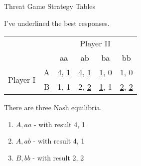 \documentclass[ignorenonframetext,]{beamer}
\providecommand{\tightlist}{%
  \setlength{\itemsep}{0pt}\setlength{\parskip}{0pt}}
\renewcommand{\,}{\text{, }}
\begin{document}
\begin{frame}{Threat Game Strategy Tables}
\protect\hypertarget{threat-game-strategy-tables-1}{}

I've underlined the best responses.

\begin{center}
\begin{tabular}{l r | c c c c}
& & \multicolumn{4}{c}{Player II} \\
& & aa & ab & ba & bb \\ \hline 
\multirow{2}{*}{Player I} 
& A & \underline{4}, \underline{1} & \underline{4}, \underline{1} & \underline{1}, 0 & 1, 0 \\
& B & 1, 1 & 2, \underline{2} & \underline{1}, 1 & \underline{2}, \underline{2} 
\end{tabular}
\end{center}

There are three Nash equilibria.

\begin{enumerate}
\tightlist
\item
  \(A, aa\) - with result 4, 1
\item
  \(A, ab\) - with result 4, 1
\item
  \(B, bb\) - with result 2, 2
\end{enumerate}

\end{frame}
\end{document}
